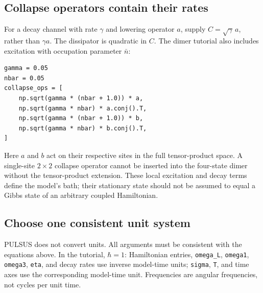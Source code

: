 \subsection{Collapse operators contain their rates}

For a decay channel with rate $\gamma$ and lowering operator $a$, supply
$C=\sqrt{\gamma}\,a$, rather than $\gamma a$. The dissipator is quadratic in
$C$. The dimer tutorial also includes excitation with occupation parameter
$\bar n$:
\par\noindent
\begin{minipage}{\linewidth}
\begin{lstlisting}[style=python]
gamma = 0.05
nbar = 0.05
collapse_ops = [
    np.sqrt(gamma * (nbar + 1.0)) * a,
    np.sqrt(gamma * nbar) * a.conj().T,
    np.sqrt(gamma * (nbar + 1.0)) * b,
    np.sqrt(gamma * nbar) * b.conj().T,
]
\end{lstlisting}
\end{minipage}\par
Here $a$ and $b$ act on their respective sites in the full tensor-product
space. A single-site $2\times2$ collapse operator cannot be inserted into
the four-state dimer without the tensor-product extension. These local
excitation and decay terms define the model's bath; their stationary state
should not be assumed to equal a Gibbs state of an arbitrary coupled
Hamiltonian.

\subsection{Choose one consistent unit system}

PULSUS does not convert units. All arguments must be consistent with the
equations above. In the tutorial, $\hbar=1$: Hamiltonian entries,
\texttt{omega\_L}, \texttt{omega1}, \texttt{omega3}, \texttt{eta}, and
decay rates use inverse model-time units; \texttt{sigma}, \texttt{T}, and
time axes use the corresponding model-time unit. Frequencies are angular
frequencies, not cycles per unit time.

